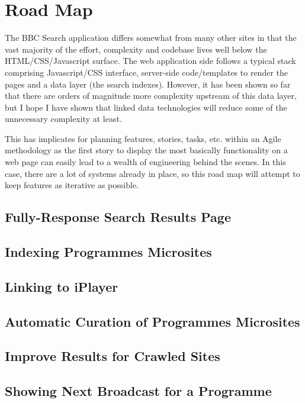 \section{Road Map}

The BBC Search application differs somewhat from many other sites in that
the vast majority of the effort, complexity and codebase lives well
below the HTML/CSS/Javascript surface. The web application side follows
a typical stack comprising Javascript/CSS interface, server-side code/templates
to render the pages and a data layer (the search indexes). However, it has been
shown so far that there are orders of magnitude more complexity upstream
of this data layer, but I hope I have shown that linked data technologies
will reduce some of the unnecessary complexity at least.

This has implicates for planning features, stories, tasks, etc. within
an Agile methodology as the first story to display the most basically
functionality on a web page can easily lead to a wealth of engineering
behind the scenes. In this case, there are a lot of systems already in
place, so this road map will attempt to keep features as iterative as possible.

\subsection{Fully-Response Search Results Page}


\subsection{Indexing Programmes Microsites}


\subsection{Linking to iPlayer}


\subsection{Automatic Curation of Programmes Microsites}


\subsection{Improve Results for Crawled Sites}


\subsection{Showing Next Broadcast for a Programme}


